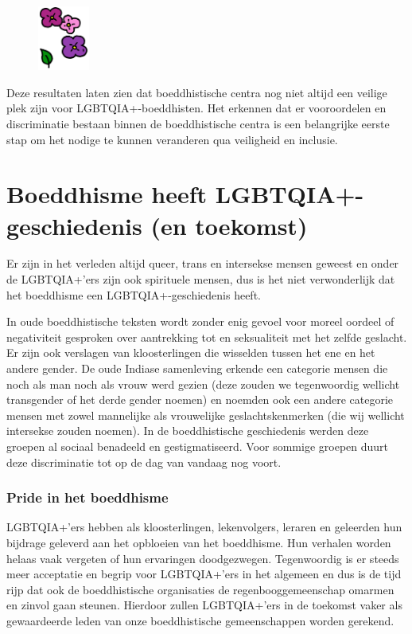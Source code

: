 \documentclass[12pt,openany]{book}
\begin{document}
\begin{figure}
    \centering
    \includegraphics[width=0.15\textwidth]{2c4.png}
\end{figure}

Deze resultaten laten zien dat boeddhistische centra nog niet altijd een veilige plek zijn voor LGBTQIA+-boeddhisten. Het erkennen dat er vooroordelen en discriminatie bestaan binnen de boeddhistische centra is een belangrijke eerste stap om het nodige te kunnen veranderen qua veiligheid en inclusie.

\section*{Boeddhisme heeft LGBTQIA+-geschiedenis (en toekomst)}

Er zijn in het verleden altijd queer, trans en intersekse mensen geweest en onder de LGBTQIA+'ers zijn ook spirituele mensen, dus is het niet verwonderlijk dat het boeddhisme een LGBTQIA+-geschiedenis heeft.

In oude boeddhistische teksten wordt zonder enig gevoel voor moreel oordeel of negativiteit gesproken over aantrekking tot en seksualiteit met het zelfde geslacht. Er zijn ook verslagen van kloosterlingen die wisselden tussen het ene en het andere gender. De oude Indiase samenleving erkende een categorie mensen die noch als man noch als vrouw werd gezien (deze zouden we tegenwoordig wellicht transgender of het derde gender noemen) en noemden ook een andere categorie mensen met zowel mannelijke als vrouwelijke geslachtskenmerken (die wij wellicht intersekse zouden noemen). In de boeddhistische geschiedenis werden deze groepen al sociaal benadeeld en gestigmatiseerd. Voor sommige groepen duurt deze discriminatie tot op de dag van vandaag nog voort.

\subsubsection*{Pride in het boeddhisme}

LGBTQIA+'ers hebben als kloosterlingen, lekenvolgers, leraren en geleerden hun bijdrage geleverd aan het opbloeien van het boeddhisme. Hun verhalen worden helaas vaak vergeten of hun ervaringen doodgezwegen. Tegenwoordig is er steeds meer acceptatie en begrip voor LGBTQIA+'ers in het algemeen en dus is de tijd rijp dat ook de boeddhistische organisaties de regenbooggemeenschap omarmen en zinvol gaan steunen. Hierdoor zullen LGBTQIA+'ers in de toekomst vaker als gewaardeerde leden van onze boeddhistische gemeenschappen worden gerekend.
\end{document}
